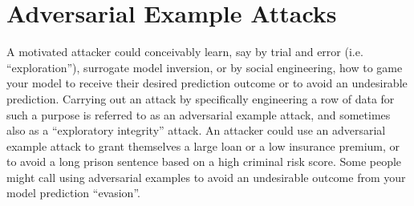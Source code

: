 \documentclass[fleqn]{article}
\begin{document}
\section{Adversarial Example Attacks} \label{sec:adv}

A motivated attacker could conceivably learn, say by trial and error (i.e. ``exploration''), surrogate model inversion, or by social engineering, how to game your model to receive their desired prediction outcome or to avoid an undesirable prediction. Carrying out an attack by specifically engineering a row of data for such a purpose is referred to as an adversarial example attack, and sometimes also as a ``exploratory integrity'' attack. An attacker could use an adversarial example attack to grant themselves a large loan or a low insurance premium, or to avoid a long prison sentence based on a high criminal risk score. Some people might call using adversarial examples to avoid an undesirable outcome from your model prediction ``evasion''.\\
\end{document}
